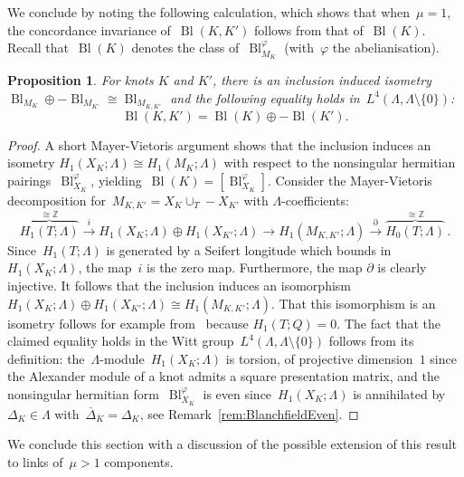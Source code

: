 \documentclass[10.9pt,a4paper]{amsart}
\newtheorem{proposition}[theorem]{Proposition}
\theoremstyle{definition}
\theoremstyle{remark}
\newcommand{\Z}{\mathbb{Z}}
\newcommand{\Bl}{\operatorname{Bl}}
\begin{document}
We conclude by noting the following calculation,  which shows that when~$\mu=1$, the concordance invariance 
of~$\Bl(K,K')$ follows from that of~$\Bl(K)$.
Recall that~$\Bl(K)$ denotes the class of~$\Bl^\varphi_{M_K}$ (with~$\varphi$ the abelianisation).

\begin{proposition}
\label{prop:FLNP}
For knots $K$ and $K'$,  there is an inclusion induced isometry~$\Bl_{M_K}\oplus -\Bl_{M_{K'}} \cong \Bl_{M_{K,K'}}$ and
the following equality holds in~$L^4(\Lambda,\Lambda\setminus\{0\})$:
$$\Bl(K,K') =\Bl(K) \oplus -\Bl(K').$$
\end{proposition}
\begin{proof}
A short Mayer-Vietoris argument shows that the inclusion induces an isometry $H_1(X_K;\Lambda)\cong H_1(M_K;\Lambda)$ with respect to the nonsingular hermitian pairings~$\Bl^\varphi_{X_K}$, yielding~$\Bl(K)=[\Bl^\varphi_{X_K}]$. Consider the Mayer-Vietoris decomposition for~$M_{K,K'}=X_K \cup_T -X_{K'}$ with $\Lambda$-coefficients:
$$
\overbrace{H_1(T;\Lambda)}^{\cong\Z} \xrightarrow{i} H_1(X_K;\Lambda)\oplus H_1(X_{K'};\Lambda)
\to H_1(M_{K,K'};\Lambda) \xrightarrow{\partial} \overbrace{H_0(T;\Lambda)}^{\cong \Z}\,.
$$
Since~$H_1(T;\Lambda)$ is generated by a Seifert longitude which bounds in~$H_1(X_K;\Lambda)$,
the map~$i$ is the zero map. 
Furthermore, the map $\partial$ is clearly injective.
It follows that the inclusion induces an isomorphism~$H_1(X_K;\Lambda)\oplus H_1(X_{K'};\Lambda)
\cong H_1(M_{K,K'};\Lambda)$.
That this isomorphism is an isometry follows for example from~\cite[Theorem~1.1]{FriedlLeidyNagelPowell} because $H_1(T;Q)=0$.
The fact that the claimed equality holds in the Witt group~$L^4(\Lambda,\Lambda\setminus\{0\})$ follows from
its definition: the~$\Lambda$-module~$H_1(X_K;\Lambda)$ is torsion, of projective dimension~$1$ since the Alexander module of a knot admits a square presentation matrix, and the nonsingular hermitian form~$\Bl^\varphi_{X_K}$ is even since~$H_1(X_K;\Lambda)$ is annihilated by~$\Delta_K\in\Lambda$ with~$\overline{\Delta}_K=\Delta_K$, see Remark~\ref{rem:BlanchfieldEven}.
\end{proof}


We conclude this section with a discussion of the possible extension of this result to links of~$\mu>1$ components.
\end{document}
